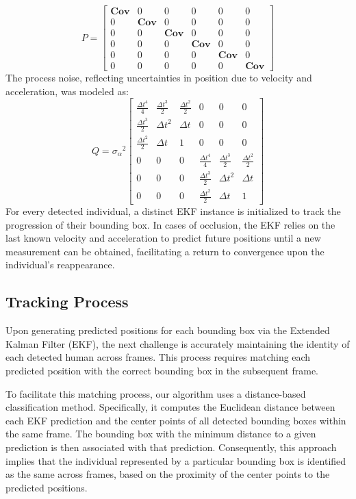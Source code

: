 \documentclass{article}
\begin{document}
\begin{equation}    P = \begin{bmatrix} \textbf{Cov} & 0 & 0 & 0 & 0 & 0\\ 0 & \textbf{Cov} & 0 & 0 & 0 & 0\\ 0 & 0 & \textbf{Cov} & 0 & 0 & 0\\ 0 & 0 & 0 & \textbf{Cov} & 0 & 0\\ 0 & 0 & 0 & 0 & \textbf{Cov} & 0\\ 0 & 0 & 0 & 0 & 0 & \textbf{Cov} \end{bmatrix}    \label{StateCovMat}\end{equation}
The process noise, reflecting uncertainties in position due to velocity and acceleration, was modeled as:
\begin{equation}    Q = {{\sigma}_\alpha}^2 \begin{bmatrix} \frac{{\Delta{t}}^4}{4} & \frac{{\Delta{t}}^3}{2} & \frac{{\Delta{t}}^2}{2} & 0 & 0 & 0\\ \frac{{\Delta{t}}^3}{2} & {\Delta{t}}^2 & \Delta{t} & 0 & 0 & 0\\ \frac{{\Delta{t}}^2}{2} & \Delta{t} & 1 & 0 & 0 & 0\\ 0 & 0 & 0 & \frac{{\Delta{t}}^4}{4} & \frac{{\Delta{t}}^3}{2} & \frac{{\Delta{t}}^2}{2}\\ 0 & 0 & 0 & \frac{{\Delta{t}}^3}{2} & {\Delta{t}}^2 & \Delta{t}\\ 0 & 0 & 0 & \frac{{\Delta{t}}^2}{2} & \Delta{t} & 1 \end{bmatrix}    \label{ProcNoisetMat}\end{equation}
For every detected individual, a distinct EKF instance is initialized to track the progression of their bounding box. In cases of occlusion, the EKF relies on the last known velocity and acceleration to predict future positions until a new measurement can be obtained, facilitating a return to convergence upon the individual's reappearance.


\subsection{Tracking Process}
Upon generating predicted positions for each bounding box via the Extended Kalman Filter (EKF), the next challenge is accurately maintaining the identity of each detected human across frames. This process requires matching each predicted position with the correct bounding box in the subsequent frame.

To facilitate this matching process, our algorithm uses a distance-based classification method. Specifically, it computes the Euclidean distance between each EKF prediction and the center points of all detected bounding boxes within the same frame. The bounding box with the minimum distance to a given prediction is then associated with that prediction. Consequently, this approach implies that the individual represented by a particular bounding box is identified as the same across frames, based on the proximity of the center points to the predicted positions.
\end{document}
